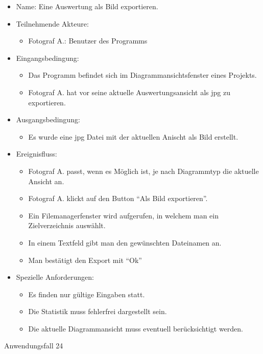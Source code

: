 \begin{itemize}
\begin{itemize}
\item Name: Eine Auswertung als Bild exportieren.
\item Teilnehmende Akteure:
\begin{itemize}
\item Fotograf A.: Benutzer des Programms
\end{itemize}
\item Eingangsbedingung:
\begin{itemize}
\item Das Programm befindet sich im Diagrammansichtsfenster eines Projekts.
\item Fotograf A. hat vor seine aktuelle Auswertungsansicht als \gls{jpg} zu exportieren.
\end{itemize}
\item Ausgangsbedingung:
\begin{itemize}
\item Es wurde eine \gls{jpg} Datei mit der aktuellen Anischt als Bild erstellt.
\end{itemize}
\item Ereignisfluss:
\begin{itemize}
\item Fotograf A. passt, wenn es Möglich ist, je nach Diagrammtyp die aktuelle Ansicht an.
\item Fotograf A. klickt auf den Button "`Als Bild exportieren"'.
\item Ein Filemanagerfenster wird aufgerufen, in welchem man ein Zielverzeichnis auswählt.
\item In einem Textfeld gibt man den gewünschten Dateinamen an.
\item Man bestätigt den Export mit "`Ok"' 
\end{itemize}
\item Spezielle Anforderungen:
\begin{itemize}
\item Es finden nur gültige Eingaben statt.
\item Die Statistik muss fehlerfrei dargestellt sein.
\item Die aktuelle Diagrammansicht muss eventuell berücksichtigt werden.
\end{itemize}
\end{itemize}
 
\begin{description}
\item[Anwendungsfall 24]
\end{description}
 

\end{itemize}

